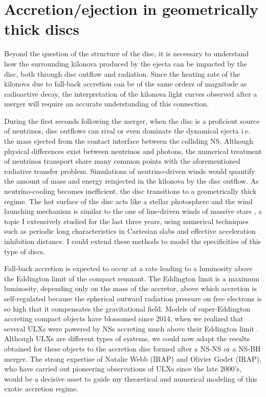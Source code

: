 \documentclass[11pt,onecolumn]{article}
\makeatletter
\newcommand{\ulxs}{ULXs\xspace}
\newcommand*{\ns}{NS\@\xspace}
\newcommand*{\nss}{NSs\@\xspace}
\newcommand*{\bh}{BH\@\xspace}
\newcommand*{\ie}{i.e.\@\xspace}
\makeatother
\begin{document}
\section{Accretion/ejection in geometrically thick discs}

Beyond the question of the structure of the disc, it is necessary to understand how the surrounding kilonova produced by the ejecta can be impacted by the disc, both through disc outflow and radiation. Since the heating rate of the kilonova due to fall-back accretion can be of the same orders of magnitude as radioactive decay, the interpretation of the kilonova light curves observed after a merger will require an accurate understanding of this connection. 

During the first seconds following the merger, when the disc is a proficient source of neutrinos, disc outflows can rival or even dominate the dynamical ejecta \ie the mass ejected from the contact interface between the colliding \ns. Although physical differences exist between neutrinos and photons, the numerical treatment of neutrinos transport share many common points with the aforementioned radiative transfer problem. Simulations of neutrino-driven winds would quantify the amount of mass and energy reinjected in the kilonova by the disc outflow. As neutrino-cooling becomes inefficient, the disc transitions to a geometrically thick regime. The hot surface of the disc acts like a stellar photosphere and the wind launching mechanism is similar to the one of line-driven winds of massive stars \citep{Castor1975}, a topic I extensively studied for the last three years, using numerical techniques such as periodic long characteristics in Cartesian slabs and effective acceleration inhibition distance. I could extend these methods to model the specificities of this type of discs.

Fall-back accretion is expected to occur at a rate leading to a luminosity above the Eddington limit of the compact remnant. The Eddington limit is a maximum luminosity, depending only on the mass of the accretor, above which accretion is self-regulated because the spherical outward radiation pressure on free electrons is so high that it compensates the gravitational field. Models of super-Eddington accreting compact objects have blossomed since 2014, when we realized that several \ulxs were powered by \nss accreting much above their Eddington limit \citep{Bachetti2014}. Although \ulxs are different types of systems, we could now adapt the results obtained for these objects to the accretion disc formed after a \ns-\ns or a \ns-\bh merger. The strong expertise of Natalie Webb (IRAP) and Olivier Godet (IRAP), who have carried out pioneering observations of \ulxs since the late 2000's, would be a decisive asset to guide my theoretical and numerical modeling of this exotic accretion regime.
\end{document}
